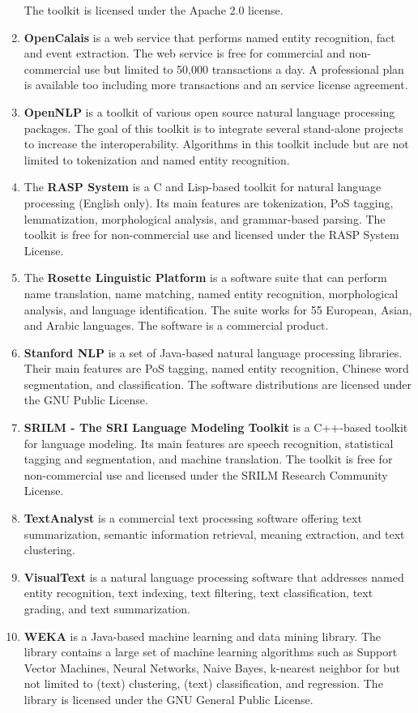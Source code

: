 \documentclass[a4paper,twoside]{book}      %
\begin{document}
\begin{enumerate}
The toolkit is licensed under the Apache 2.0 license.
\item \textbf{OpenCalais} \cite{opencalais} is a web service that performs named entity recognition, fact and event extraction.
The web service is free for commercial and non-commercial use but limited to 50,000 transactions a day. A professional plan is available too including more transactions and an service license agreement.
\item \textbf{OpenNLP} \cite{opennlp} is a toolkit of various open source natural language processing packages. The goal of this toolkit is to integrate several stand-alone projects to increase the interoperability. Algorithms in this toolkit include but are not limited to tokenization and named entity recognition.
\item The \textbf{RASP System} \cite{briscoe2006second} is a C and Lisp-based toolkit for natural language processing (English only). Its main features are tokenization, PoS tagging, lemmatization, morphological analysis, and grammar-based parsing.
The toolkit is free for non-commercial use and licensed under the RASP System License.
\item The \textbf{Rosette Linguistic Platform} \cite{rosette} is a software suite that can perform name translation, name matching, named entity recognition, morphological analysis, and language identification. The suite works for 55 European, Asian, and Arabic languages.
The software is a commercial product.
\item \textbf{Stanford NLP} \cite{stanfordnlp} is a set of Java-based natural language processing libraries. Their main features are PoS tagging, named entity recognition, Chinese word segmentation, and classification.
The software distributions are licensed under the GNU Public License.
\item \textbf{SRILM - The SRI Language Modeling Toolkit} \cite{stolcke2002srilm} is a C++-based toolkit for language modeling. Its main features are speech recognition, statistical tagging and segmentation, and machine translation.
The toolkit is free for non-commercial use and licensed under the SRILM Research Community License.
\item \textbf{TextAnalyst} \cite{textanalyst} is a commercial text processing software offering text summarization, semantic information retrieval, meaning extraction, and text clustering.
\item \textbf{VisualText} \cite{visualtext} is a natural language processing software that addresses named entity recognition, text indexing, text filtering, text classification, text grading, and text summarization.
\item \textbf{WEKA} \cite{hall2009weka} is a Java-based machine learning and data mining library. The library contains a large set of machine learning algorithms such as Support Vector Machines, Neural Networks, Naive Bayes, k-nearest neighbor for but not limited to (text) clustering, (text) classification, and regression.
The library is licensed under the GNU General Public License.
\end{enumerate}
\end{document}
